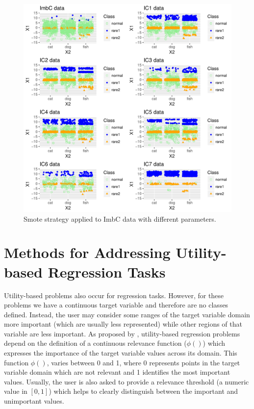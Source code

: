 \documentclass[10pt,a4paper]{article}\usepackage[]{graphicx}\usepackage[]{color}
\makeatletter
\def\maxwidth{ %
  \ifdim\Gin@nat@width>\linewidth
    \linewidth
  \else
    \Gin@nat@width
  \fi
}
\newenvironment{knitrout}{}{} %
\makeatother
\begin{document}
\begin{knitrout}\footnotesize
{}\color{fgcolor}\begin{figure}

{\centering \includegraphics[width=\maxwidth]{figures/UBL-smote_plot2-1} 

}

\caption[Smote strategy applied to ImbC data with different parameters]{Smote strategy applied to ImbC data with different parameters.}\label{fig:smote_plot2}
\end{figure}


\end{knitrout}


\section{Methods for Addressing Utility-based Regression Tasks}\label{sec:methRegres}

Utility-based problems also occur for regression tasks. However, for these problems we have a continuous target variable and therefore are no classes defined. Instead, the user may consider some ranges of the target variable domain more important (which are usually less represented) while other regions of that variable are less important. As proposed by \cite{torgo2007utility, ribeiro2011utility}, utility-based regression problems depend on the definition of a continuous relevance function ($\phi()$) which expresses the importance of the target variable values across its domain. This function $\phi()$, varies between 0 and 1, where 0 represents points in the target variable domain which are not relevant and 1 identifies the most important values. Usually, the user is also asked to provide a relevance threshold (a numeric value in $[0,1]$) which helps to clearly distinguish between the important and unimportant values.
\end{document}
